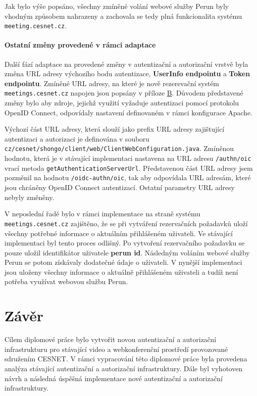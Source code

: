 \documentclass[
  printed, %
  twoside, %
  table,   %
  nolof,     %
  nolot,     %
]{fithesis3}
\begin{document}
Jak bylo výše popsáno, všechny zmíněné volání webové služby Perun byly vhodným způsobem nahrazeny a zachovala se tedy plná funkcionalita systému \texttt{meeting.cesnet.cz}.

\subsubsection{Ostatní změny provedené v rámci adaptace}
Další fází adaptace na provedené změny v autentizační a autorizační vrstvě byla změna URL adresy výchozího bodu autentizace, \textbf{UserInfo endpointu} a \textbf{Token endpointu}. Zmíněné URL adresy, na které je nově rezerevační systém \texttt{meetings.cesnet.cz} napojen jsou popsány v příloze \hyperref[oidcEndpoints]{B}. Důvodem představené změny bylo aby zdroje, jejichž využití vyžaduje autentizaci pomocí protokolu OpenID Connect, odpovídaly nastavení definovaném v rámci konfigurace Apache. \par


Výchozí část URL adresy, která slouží jako prefix URL adresy zajištující autentizaci a autorizaci je definována v souboru \texttt{cz/cesnet/shongo/client/web/ClientWebConfiguration.java}. Zmíněnou hodnotu, která je v stávající implementaci nastavena na URL adresu \texttt{/authn/oic} vrací metoda \texttt{getAuthenticationServerUrl}. Představenou část URL adresy jsem pozměnil na hodnotu \texttt{/oidc-authn/oic}, tak aby odpovídala URL adresám, které jsou chráněny OpenID Connect autentizací. Ostatní parametry URL adresy nebyly změněny. 
\par

V neposlední řadě bylo v rámci implementace na straně systému \texttt{meetings.cesnet.cz} zajištěno, že se při vytváření rezervačních požadavků uloží všechny potřebné informace o aktuálním přihlášeném uživateli. Ve stávající implementaci byl tento proces odlišný. Po vytvoření rezervačního požadavku se pouze uložil identifikátor uživatele \textbf{perun id}. Následným voláním webové služby Perun se potom získávaly dodatečné údaje o uživateli. V nynější implementaci jsou uloženy všechny informace o aktuálně přihlášeném uživateli a tudíž není potřeba využívat webovou službu Perun. 

\chapter{Závěr}
Cílem diplomové práce bylo vytvořit novou autentizační a autorizační infrastrukturu pro stávající video a webkonferenční prostředí provozované sdružením CESNET. V rámci vypracování této diplomové práce byla provedena analýza stávající autentizační a autorizační infrastruktury. Dále byl vyhotoven návrh a následná úspěšná implementace nové autentizační a autorizační infrastruktury.  
\end{document}
